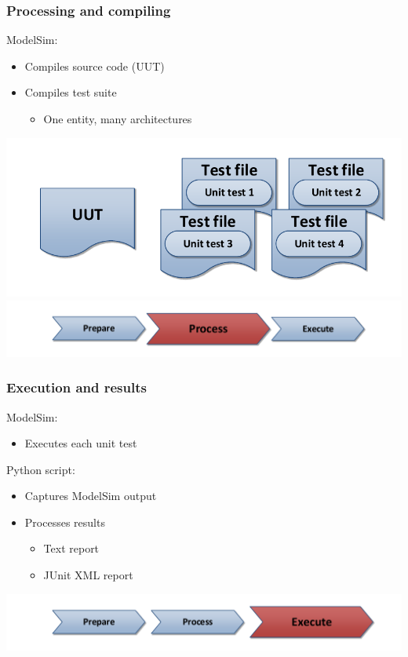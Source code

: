 \documentclass[british,10pt]{beamer}
\begin{document}
\begin{frame}\frametitle{Processing and compiling}
\vskip40pt
ModelSim:
\begin{itemize}
\item Compiles source code (UUT)
\item Compiles test suite
\begin{itemize}
\item[\ding{222}] One entity, many architectures
\end{itemize}
\end{itemize}
\centering
\includegraphics[width=.75\textwidth]{images/sources.pdf}
\vskip10pt
\includegraphics[width=.7\textwidth]{images/ppe2.pdf}
\end{frame}


\begin{frame}\frametitle{Execution and results}
\vskip48pt
ModelSim:
\begin{itemize}
\item Executes each unit test
\end{itemize}
\vskip5pt
Python script:
\begin{itemize}
\item Captures ModelSim output
\item Processes results
\begin{itemize}
\item Text report
\item JUnit XML report
\end{itemize}
\end{itemize}
\centering
\vskip48pt
\includegraphics[width=.7\textwidth]{images/ppe3.pdf}
\end{frame}
\end{document}
